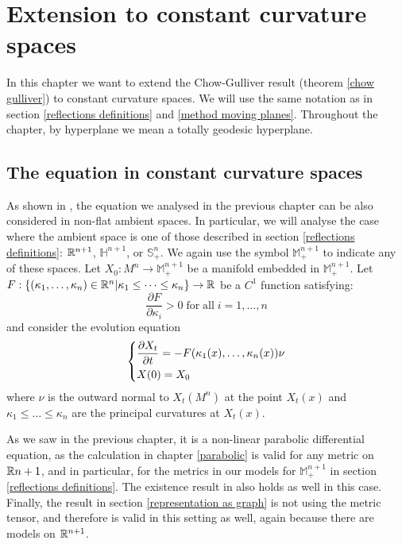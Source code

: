 \chapter{Extension to constant curvature spaces}
In this chapter we want to extend the Chow-Gulliver result (theorem \ref{chow gulliver}) to constant curvature spaces. We will use the same notation as in section 
\ref{reflections definitions} and \ref{method moving planes}. 
Throughout the chapter, by hyperplane we mean a totally geodesic hyperplane. 

\section{The equation in constant curvature spaces}	
As shown in \cite{huisken}, the equation we analysed in the previous chapter can be also considered in non-flat ambient spaces. In particular, we will analyse the case where the ambient space is one of those described  in section \ref{reflections definitions}: $\mathbb{R}^{n+1}$, $\mathbb{H}^{n+1}$, or $\mathbb{S}^n_+$. We again use the symbol $\mathbb{M}^{n+1}_+$ to indicate any of these spaces. 
Let $X_0 : M^n \rightarrow \mathbb{M}^{n+1}_+$ be a manifold embedded in $\mathbb{M}^{n+1}_+$. 
Let $F:\{(\kappa_1, \dots , \kappa_n)\in \mathbb{R}^n\vert \kappa_1\leq \dots \leq \kappa_n\}\rightarrow \mathbb{R}$ be a $C^1$ function satisfying:
\begin{equation}
	\frac{\partial F}{\partial \kappa_i} > 0 \mathrm{\; for \; all } \; i=1,\dots, n \label{parabolicità_ext}
\end{equation}
and consider the evolution equation 
\begin{align}
	\begin{dcases}
		\frac{\partial X_t}{\partial t} = - F(\kappa_1(x), \dots , \kappa_n(x)) \nu\\
		X(0)= X_0
	\end{dcases} \label{evolutioneq_ext}
\end{align}
where $\nu$ is the outward normal to $X_t(M^n)$ at the point $X_t(x)$ and $\kappa_1\leq \dots \leq \kappa_n$ are the principal curvatures at $X_t(x)$. 

As we saw in the previous chapter, it is a non-linear parabolic differential equation, as the calculation in chapter \ref{parabolic} is valid for any metric on $\mathbb{R}{n+1}$, and in particular, for the metrics in our models for $\mathbb{M}^{n+1}_+$ in section \ref{reflections definitions}. The existence result in \cite{huisken} also holds as well in this case. Finally, the result in section \ref{representation as graph} is not using the metric tensor, and therefore is valid in this setting as well, again because there are models on $\mathbb{R}^{n+1}$. 

